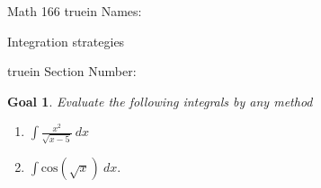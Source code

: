 \documentclass[12pt]{article}
\newtheorem*{goal}{Goal}
\begin{document}
\pagestyle{empty} %

\noindent
{Math 166  truein  Names:\ \hrulefill}

\noindent
{Integration strategies}

\noindent  {} truein  Section Number:\ \hrulefill
\medskip

\begin{goal} \rm
Evaluate the following integrals by any method
\end{goal}

\begin{enumerate}


\item $\displaystyle\int\frac{x^2}{\sqrt{x-5}} \  dx$
\vfill
\item $\displaystyle\int  \displaystyle\mathrm{cos}(\sqrt{x}) \ dx$.
\vfill



\end{enumerate}
\end{document}
